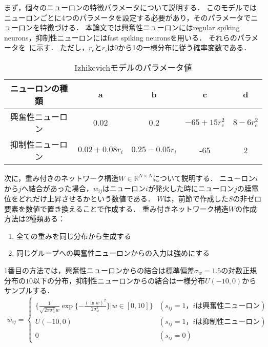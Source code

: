 まず，個々のニューロンの特徴パラメータについて説明する．
このモデルではニューロンごとに4つのパラメータを設定する必要があり，そのパラメータでニューロンを特徴づける．
本論文では興奮性ニューロンにはregular spiking neurons，抑制性ニューロンにはfast spiking neuronsを用いる．
それらのパラメータを~に示す．
ただし，$r_e$と$r_i$は0から1の一様分布に従う確率変数である．

\begin{table}[htb]
  \center
  \begin{tabular}{|c|cccc|} \hline
    ニューロンの種類 & a & b & c & d \\ \hline
    興奮性ニューロン & 0.02 & 0.2 & $-65 + 15 r_e^2$ & $8 - 6r_e^2$ \\
    抑制性ニューロン & $0.02 + 0.08r_i$ & $0.25 - 0.05 r_i$ & -65 & 2 \\ \hline
  \end{tabular}
  \caption{Izhikevichモデルのパラメータ値}
  \label{tab:parameter2}
\end{table}

次に，重み付きのネットワーク構造$W \in \mathbb{R}^{N \times N}$について説明する．
ニューロン$i$から$j$へ結合があった場合，$w_{ij}$はニューロン$i$が発火した時にニューロン$j$の膜電位をどれだけ上昇させるかという数値である．
$W$は，前節で作成した$S$の非ゼロ要素を数値で置き換えることで作成する．
重み付きネットワーク構造$W$の作成方法は2種類ある：
\begin{enumerate}
  \item 全ての重みを同じ分布から生成する
  \item 同じグループへの興奮性ニューロンからの入力は強めにする
\end{enumerate}
1番目の方法では，興奮性ニューロンからの結合は標準偏差$\sigma_w = 1.5$の対数正規分布の$10$以下の分布，抑制性ニューロンからの結合は一様分布$U(-10,0)$からサンプルする．
\begin{align}
	w_{ij} = \begin{cases}
		\{\frac{1}{\sqrt{2 \pi \sigma_w^2}w} \exp \{ - \frac{(\ln w)^2}{2 \sigma_w^2}\} | w \in [0,10]\} & (s_{ij} = 1 \text{，$i$は興奮性ニューロン}) \\
		U(-10,0) & (s_{ij} = 1 \text{，$i$は抑制性ニューロン}) \\
		0 & (s_{ij} = 0)
  \end{cases}
	\label{eq:W}
\end{align}

